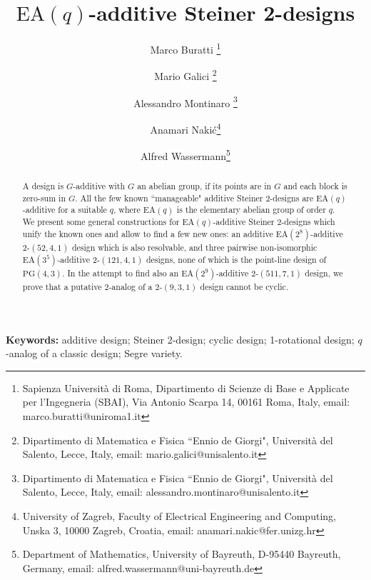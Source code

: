 \documentclass[a4paper, 11pt]{article}
\theoremstyle{definition}
\theoremstyle{definition}
\theoremstyle{definition}
\numberwithin{equation}{section}
\begin{document}
	\date{}
	\title{$\mathrm{ EA}(q)$-additive Steiner 2-designs}
	\author{Marco Buratti \thanks{Sapienza Universit\`a di Roma,  Dipartimento di Scienze di Base e Applicate per l'Ingegneria (SBAI), Via Antonio Scarpa 14, 00161 Roma, Italy, email: marco.buratti@uniroma1.it} \and
	Mario Galici \thanks{Dipartimento di Matematica e Fisica ``Ennio de Giorgi", Universit\`a del Salento, Lecce, Italy, email: mario.galici@unisalento.it}  \and
	Alessandro Montinaro
	\thanks{Dipartimento di Matematica e Fisica ``Ennio de Giorgi", Universit\`a del Salento, Lecce, Italy,  email: alessandro.montinaro@unisalento.it}  \and
	Anamari Naki\'c\thanks{University of Zagreb, Faculty of Electrical Engineering and Computing, Unska 3, 10000 Zagreb, Croatia, email: anamari.nakic@fer.unizg.hr}  \and
	Alfred Wassermann\thanks{Department of Mathematics, University of Bayreuth, D-95440 Bayreuth,
	Germany, email: alfred.wassermann@uni-bayreuth.de}}

	\maketitle
	
	
	
\begin{abstract}
A design is $G$-additive with $G$ an abelian group, if its points are in $G$ and each block is zero-sum in $G$. 
All the few known ``manageable" additive Steiner 2-designs are $\mathrm{EA}(q)$-additive for a suitable $q$, where $\mathrm{EA}(q)$ is the elementary abelian group of order $q$. We present some general constructions for $\mathrm{EA}(q)$-additive Steiner 2-designs which unify the known ones and allow to find a few new ones: an additive $\mathrm{EA}(2^8)$-additive 2-$(52,4,1)$ design which is also resolvable, and three pairwise non-isomorphic
$\mathrm{EA}(3^5)$-additive 2-$(121,4,1)$ designs, none of which is the point-line design of $\mathrm{PG}(4,3)$.
In the attempt to find also an $\mathrm{EA}(2^9)$-additive 2-$(511,7,1)$ design, we prove that a putative
2-analog of a 2-$(9,3,1)$ design cannot be cyclic.
\end{abstract}
\noindent \small{\bf Keywords:} \scriptsize
additive design; Steiner 2-design; cyclic design; 1-rotational design; $q$-analog of a classic design; Segre variety.

\normalsize
\eject
\end{document}
